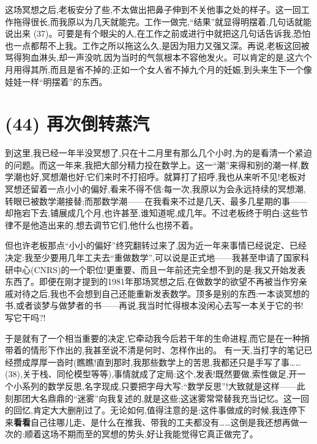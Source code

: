 这场冥想之后,老板安分了些,不太做出把鼻子伸到不关他事之处的样子。这一回工作拖得很长,而我原以为几天就能完。工作一做完,“结果”就显得明摆着,几句话就能说出来 (37)。可要是有个眼尖的人,在工作之前或进行中就把这几句话告诉我,恐怕也一点都帮不上我。工作之所以拖这么久,是因为阻力又强又深。再说,老板这回被骂得狗血淋头,却一声没吭,因为当时的气氛根本不容他发火。可以肯定的是,这六个月用得其所,而且是省不掉的;正如一个女人省不掉九个月的妊娠,到头来生下一个像娃娃一样“明摆着”的东西。

\section{(44) 再次倒转蒸汽}

到这里,我已经一年半没冥想了,只在十二月里有那么几个小时,为的是看清一个紧迫的问题。而这一年来,我把大部分精力投在数学上。这一“潮”来得和别的潮一样,数学潮也好,冥想潮也好:它们来时不打招呼。就算打了招呼,我也从来听不见!老板对冥想还留着一点小小的偏好,看来不得不信:每一次,我原以为会永远持续的冥想潮,转眼已被数学潮接替;而那数学潮——在我看来不过是几天、最多几星期的事——却拖宕下去,铺展成几个月,也许甚至,谁知道呢,成几年。不过老板终于明白:这些节律不是他造出来的,想去调节它们,他什么也捞不着。

但也许老板那点“小小的偏好”终究翻转过来了,因为近一年来事情已经说定、已经决定:我至少要用几年工夫去“重做数学”,可以说是正式地——我甚至申请了国家科研中心(CNRS)的一个职位!更重要、而且一年前还完全想不到的是:我又开始发表东西了。即便在刚才提到的1981年那场冥想之后,在做数学的欲望不再被当作穷亲戚对待之后,我也不会想到自己还能重新发表数学。顶多是别的东西:一本谈冥想的书,或者谈梦与做梦者的书——再说,我当时忙得根本没闲心去写一本关于它的书!
写它干吗?!

于是就有了一个相当重要的决定,它牵动我今后若干年的生命进程,而它是在一种捎带着的情形下作出的,我甚至说不清是何时、怎样作出的。 有一天,当打字的笔记已经攒成厚厚一沓时(瞧瞧!直到那时,我那些数学上的苦思,我都还只是手写了事…… (38),关于栈、同伦模型等等),事情就成了定局:这个,发表!既然要做,索性做足,开一个小系列的数学反思,名字现成,只要把字母大写:“数学反思”!大致就是这样——此刻那团大名鼎鼎的“迷雾”向我复述的,就是这些;这迷雾常常替我充当记忆。这一回的回忆,肯定大大删削过了。无论如何,值得注意的是:这件事做成的时候,我连停下来\textbf{看看}自己往哪儿走、是什么在推我、带我的工夫都没有……这倒是我还想再做一次的:顺着这场不期而至的冥想的势头,好让我能觉得它真正做完了。

